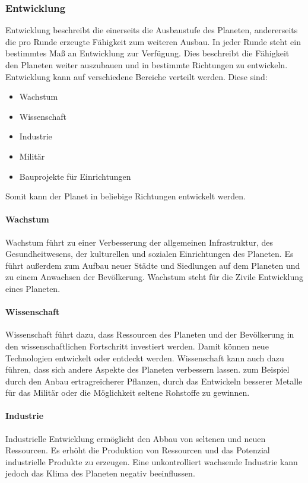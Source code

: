 \documentclass[11pt, a4paper]{article}
\begin{document}
\subsubsection{Entwicklung}
Entwicklung beschreibt die einerseits die Ausbaustufe des Planeten, andererseits die pro Runde erzeugte 
Fähigkeit zum weiteren Ausbau. In jeder Runde steht ein bestimmtes Maß an Entwicklung zur Verfügung. 
Dies beschreibt die Fähigkeit den Planeten weiter auszubauen und in bestimmte Richtungen zu entwickeln.
Entwicklung kann auf verschiedene Bereiche verteilt werden. Diese sind:
\begin{itemize}
    \item Wachstum
    \item Wissenschaft
    \item Industrie
    \item Militär
    \item Bauprojekte für Einrichtungen
\end{itemize}
%
Somit kann der Planet in beliebige Richtungen entwickelt werden.
%
\paragraph{Wachstum}
Wachstum führt zu einer Verbesserung der allgemeinen Infrastruktur, des Gesundheitwesens, der kulturellen und sozialen
Einrichtungen des Planeten. Es führt außerdem zum Aufbau neuer Städte und Siedlungen auf dem Planeten und zu einem
Anwachsen der Bevölkerung. Wachstum steht für die Zivile Entwicklung eines Planeten.
%
\paragraph{Wissenschaft}
Wissenschaft führt dazu, dass Ressourcen des Planeten und der Bevölkerung in den wissenschaftlichen Fortschritt
investiert werden. Damit können neue Technologien entwickelt oder entdeckt werden. Wissenschaft kann auch dazu 
führen, dass sich andere Aspekte des Planeten verbessern lassen. zum Beispiel durch den Anbau ertragreicherer 
Pflanzen, durch das Entwickeln besserer Metalle für das Militär oder die Möglichkeit seltene Rohstoffe zu gewinnen.

\paragraph{Industrie}
Industrielle Entwicklung ermöglicht den Abbau von seltenen und neuen Ressourcen. Es erhöht die Produktion von
Ressourcen und das Potenzial industrielle Produkte zu erzeugen. Eine unkontrolliert wachsende Industrie kann
jedoch das Klima des Planeten negativ beeinflussen.
%
\end{document}
